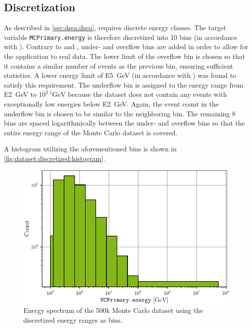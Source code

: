 \subsection{Discretization}
As described in \autoref{sec:dsea:dsea}, \dsea{} requires discrete energy classes.
The target variable \texttt{MCPrimary.energy} is therefore discretized into \num{10} bins
(in accordance with \cite{dsea_samuel}).
%
Contrary to \cite{dsea_jan} and \cite{dsea_samuel},
under- and overflow bins are added
  in order to allow for the application to real data.
%
The lower limit of the overflow bin is chosen so that it contains a similar number of events as the previous bin,
ensuring sufficient statistics.
A lower energy limit of \SI{E5}{\giga\electronvolt} (in accordance with \cite{dsea_samuel}) was found to satisfy this requirement.
%
The underflow bin is assigned to the energy range from \SI{E2}{\giga\electronvolt} to $10^{2.1} \si{\giga\electronvolt}$ %
  because the dataset does not contain any events with exceptionally low energies below \SI{E2}{\giga\electronvolt}.
Again, the event count in the underflow bin is chosen to be similar to the neighboring bin.
%
The remaining \num{8} bins are spaced logarithmically between the under- and overflow bins
  so that the entire energy range of the Monte Carlo dataset is covered.

A histogram utilizing the aforementioned bins is shown in \autoref{fig:dataset:discretized:histogram}.

\begin{figure}
  \centering
  \includegraphics[scale=1]{content/plots/dataset_500k:discretized:histogram_full.pdf}
  \caption{Energy spectrum of the 500k Monte Carlo dataset using the discretized energy ranges as bins.}
  \label{fig:dataset:discretized:histogram}
\end{figure}


